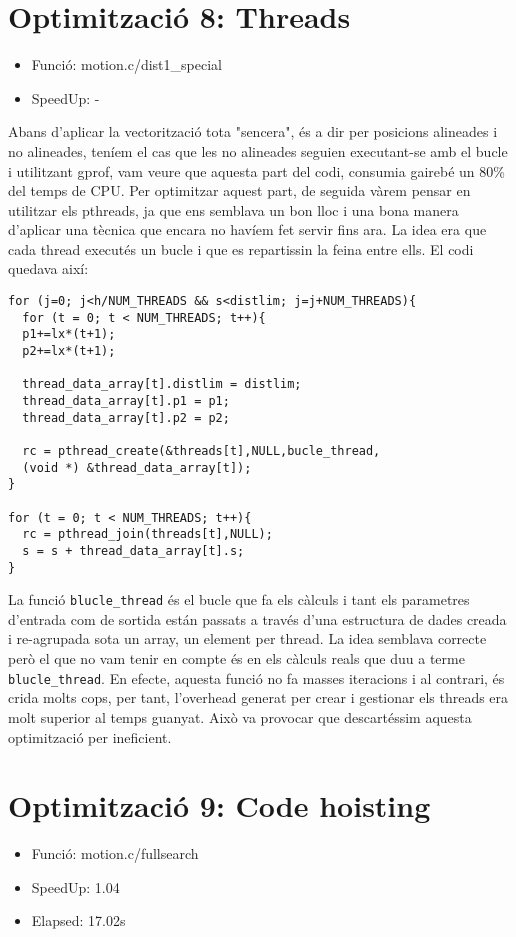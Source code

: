 \section{Optimitzaci\'o 8: Threads}
\begin{itemize}
\item{Funció: motion.c/dist1\_special}
\item{SpeedUp: -}
\end{itemize}

Abans d'aplicar la vectorització tota "sencera", és a dir per posicions alineades i no alineades, teníem el cas que les no alineades seguien executant-se amb el bucle i utilitzant gprof, vam veure que aquesta part del codi, consumia gairebé un 80\% del temps de CPU. Per optimitzar aquest part, de seguida vàrem pensar en utilitzar els pthreads, ja que ens semblava un bon lloc i una bona manera d'aplicar una tècnica que encara no havíem fet servir fins ara. La idea era que cada thread executés un bucle i que es repartissin la feina entre ells. El codi quedava així:

\begin{lstlisting}
for (j=0; j<h/NUM_THREADS && s<distlim; j=j+NUM_THREADS){   
  for (t = 0; t < NUM_THREADS; t++){
  p1+=lx*(t+1);
  p2+=lx*(t+1);

  thread_data_array[t].distlim = distlim;
  thread_data_array[t].p1 = p1;
  thread_data_array[t].p2 = p2;

  rc = pthread_create(&threads[t],NULL,bucle_thread,
  (void *) &thread_data_array[t]);
}

for (t = 0; t < NUM_THREADS; t++){
  rc = pthread_join(threads[t],NULL);
  s = s + thread_data_array[t].s;
}		 	
\end{lstlisting}

La funció \texttt{blucle\_thread} és el bucle que fa els càlculs i tant els parametres d'entrada com de sortida están passats a través d'una estructura de dades creada i re-agrupada sota un array, un element per thread. La idea semblava correcte però el que no vam tenir en compte és en els càlculs reals que duu a terme \texttt{blucle\_thread}. En efecte, aquesta funció no fa masses iteracions i al contrari, és crida molts cops, per tant, l'overhead generat per crear i gestionar els threads era molt superior al temps guanyat. Això va provocar que descartéssim aquesta optimització per ineficient.

\section{Optimitzaci\'o 9: Code hoisting}
\begin{itemize}
\item{Funció: motion.c/fullsearch}
\item{SpeedUp: 1.04}
\item{Elapsed: 17.02s}
\end{itemize}

